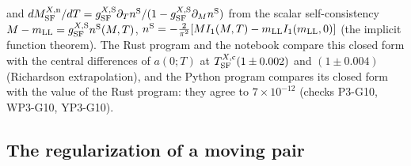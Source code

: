 \documentclass[aps,prd,onecolumn,superscriptaddress,nofootinbib,floatfix,longbibliography]{revtex4-2}
\newcommand{\LL}{{\rm LL}}
\newcommand{\SF}{{\rm SF}}
\begin{document}
and $dM^{X,{\rm n}}_\SF/dT=g^{X,{\rm S}}_\SF\partial_Tn^{\rm S}/(1-g^{X,{\rm S}}_\SF\partial_Mn^{\rm S})$ from the scalar self-consistency
$M-m_\LL=g^{X,{\rm S}}_\SF n^{\rm S}(M,T)$, $n^{\rm S}=-\frac2{\pi^2}[MI_1(M,T)-m_\LL I_1(m_\LL,0)]$ (the implicit function theorem). The Rust program
and the notebook compare this closed form with the central differences of $a(0;T)$ at $T^{X,{\rm c}}_\SF(1\pm0.002)$ and $(1\pm0.004)$
(Richardson extrapolation), and the Python program compares its closed form with the value of the Rust program: they agree to
$7\times10^{-12}$ (checks P3-G10, WP3-G10, YP3-G10).

\subsection{The regularization of a moving pair}
\label{sec:reg}
\end{document}
